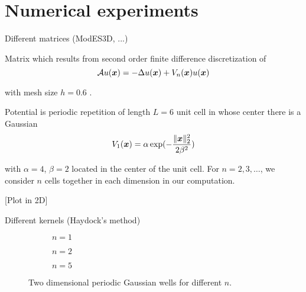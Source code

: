 \chapter{Numerical experiments}
\label{chp:5-experiments}

Different matrices (ModES3D, ...)

Matrix which results from second order finite difference discretization of
\begin{equation}
    \mathcal{A} u(\boldsymbol{x}) = - \Delta u(\boldsymbol{x}) + V_n(\boldsymbol{x}) u(\boldsymbol{x})
    \label{equ:5-experiments-electronic-hamiltonian}
\end{equation}

with mesh size $h=0.6$ \cite{lin2017randomized}.

Potential is periodic repetition of length $L=6$ unit cell in whose
center there is a Gaussian
\begin{equation}
    V_1(\boldsymbol{x}) = \alpha \exp(-\frac{\lVert \boldsymbol{x} \rVert_2^2}{ 2 \beta^2 })
\end{equation}

with $\alpha = 4$, $\beta = 2$ located in the center of the unit cell. For $n=2, 3, \dots$,
we consider $n$ cells together in each dimension in our computation.

[Plot in 2D]

Different kernels (Haydock's method)

\begin{figure}[ht]
    \begin{subfigure}[b]{0.33\columnwidth}
        
        \caption{$n=1$}
        \label{fig:5-experiments-periodic-gaussian-well-1}
    \end{subfigure}
    \begin{subfigure}[b]{0.33\columnwidth}
        
        \caption{$n=2$}
        \label{fig:5-experiments-periodic-gaussian-well-2}
    \end{subfigure}
    \begin{subfigure}[b]{0.33\columnwidth}
        
        \caption{$n=5$}
        \label{fig:5-experiments-periodic-gaussian-well-5}
    \end{subfigure}
    \caption{Two dimensional periodic Gaussian wells for different $n$.}
    \label{fig:5-experiments-periodic-gaussian-well}
\end{figure}
